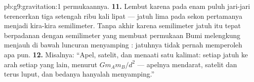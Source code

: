 \begin{solution}{pb:g9:gravitation:1}
permukaannya.
\textbf{11.} Lembut karena  pada enam puluh jari-jari
terencerkan tiga setengah ribu kali lipat --- jatuh lima  pada
sekon pertamanya  menjadi kira-kira semilimeter. Tanpa akhir
karena semilimeter jatuh itu tepat berpadanan dengan semilimeter yang
membuat permukaan Bumi melengkung menjauh di bawah luncuran menyamping
: jatuhnya tidak pernah memperoleh apa pun.
\textbf{12.} Misalnya: ``Apel, satelit, dan  menaati satu
kalimat: setiap  jatuh ke arah setiap  yang lain, menurut
$G m_A m_B / d^2$ --- apelnya mendarat, satelit dan  terus luput,
dan bedanya hanyalah  menyamping.''
\end{solution}
